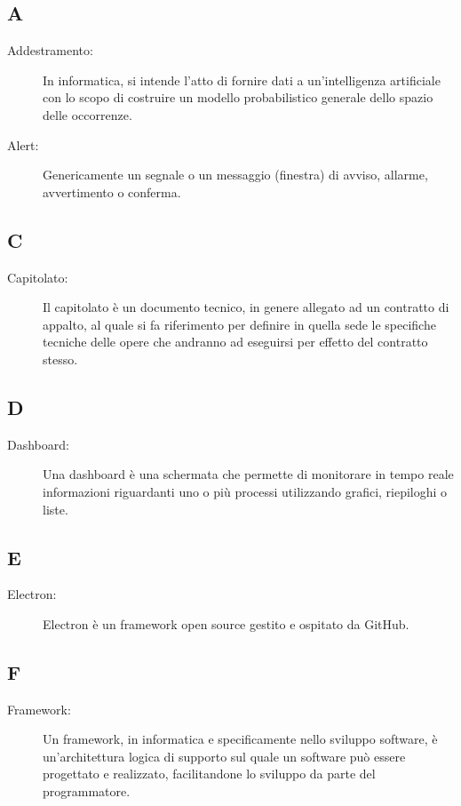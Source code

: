 \documentclass[../manuale-sviluppatore.tex]{subfiles}
\begin{document}
\subsection*{A}
\begin{description}
    \item[Addestramento:] In informatica, si intende l'atto di fornire dati a un'intelligenza artificiale con lo scopo di costruire un modello probabilistico generale dello spazio delle occorrenze.
    \item[Alert:] Genericamente un segnale o un messaggio (finestra) di avviso, allarme, avvertimento o conferma.
\end{description}

\subsection*{C}
\begin{description}
  \item[Capitolato:] Il capitolato è un documento tecnico, in genere allegato ad un contratto di appalto, al quale si fa riferimento per definire in quella sede le specifiche tecniche delle opere che andranno ad eseguirsi per effetto del contratto stesso.
\end{description}

\subsection*{D}
\begin{description}
  \item[Dashboard:] Una dashboard è una schermata che permette di monitorare in tempo reale informazioni riguardanti uno o più processi utilizzando grafici, riepiloghi o liste.
\end{description}

\subsection*{E}
\begin{description}
  \item[Electron:] Electron è un framework open source gestito e ospitato da GitHub.
\end{description}

\subsection*{F}
\begin{description}
  \item[Framework:] Un framework, in informatica e specificamente nello sviluppo software, è un'architettura logica di supporto sul quale un software può essere progettato e realizzato, facilitandone lo sviluppo da parte del programmatore.
\end{description}
\end{document}
